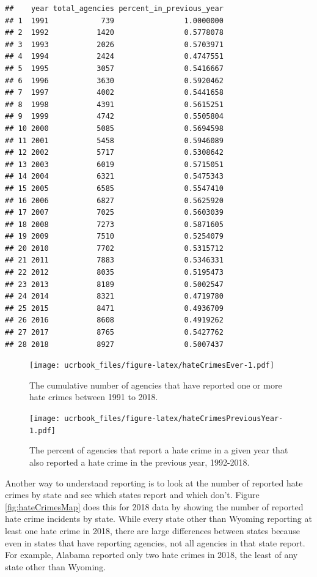 \documentclass[
  12pt,
  openany]{book}
\begin{document}
\begin{verbatim}
##    year total_agencies percent_in_previous_year
## 1  1991            739                1.0000000
## 2  1992           1420                0.5778078
## 3  1993           2026                0.5703971
## 4  1994           2424                0.4747551
## 5  1995           3057                0.5416667
## 6  1996           3630                0.5920462
## 7  1997           4002                0.5441658
## 8  1998           4391                0.5615251
## 9  1999           4742                0.5505804
## 10 2000           5085                0.5694598
## 11 2001           5458                0.5946089
## 12 2002           5717                0.5308642
## 13 2003           6019                0.5715051
## 14 2004           6321                0.5475343
## 15 2005           6585                0.5547410
## 16 2006           6827                0.5625920
## 17 2007           7025                0.5603039
## 18 2008           7273                0.5871605
## 19 2009           7510                0.5254079
## 20 2010           7702                0.5315712
## 21 2011           7883                0.5346331
## 22 2012           8035                0.5195473
## 23 2013           8189                0.5002547
## 24 2014           8321                0.4719780
## 25 2015           8471                0.4936709
## 26 2016           8608                0.4919262
## 27 2017           8765                0.5427762
## 28 2018           8927                0.5007437
\end{verbatim}

\begin{figure}
\centering
\texttt{[image: ucrbook\_files/figure-latex/hateCrimesEver-1.pdf]}
\caption{\label{fig:hateCrimesEver}The cumulative number of agencies that have reported one or more hate crimes between 1991 to 2018.}
\end{figure}

\begin{figure}
\centering
\texttt{[image: ucrbook\_files/figure-latex/hateCrimesPreviousYear-1.pdf]}
\caption{\label{fig:hateCrimesPreviousYear}The percent of agencies that report a hate crime in a given year that also reported a hate crime in the previous year, 1992-2018.}
\end{figure}

Another way to understand reporting is to look at the number of reported hate crimes by state and see which states report and which don't. Figure \ref{fig:hateCrimesMap} does this for 2018 data by showing the number of reported hate crime incidents by state. While every state other than Wyoming reporting at least one hate crime in 2018, there are large differences between states because even in states that have reporting agencies, not all agencies in that state report. For example, Alabama reported only two hate crimes in 2018, the least of any state other than Wyoming.
\end{document}

